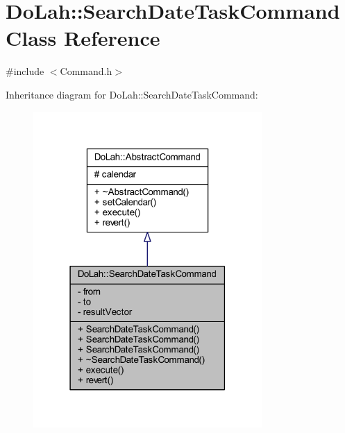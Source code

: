 \hypertarget{class_do_lah_1_1_search_date_task_command}{}\section{Do\+Lah\+:\+:Search\+Date\+Task\+Command Class Reference}
\label{class_do_lah_1_1_search_date_task_command}


{\ttfamily \#include $<$Command.\+h$>$}



Inheritance diagram for Do\+Lah\+:\+:Search\+Date\+Task\+Command\+:\nopagebreak
\begin{figure}[H]
\begin{center}
\leavevmode
\includegraphics[width=247pt]{class_do_lah_1_1_search_date_task_command__inherit__graph}
\end{center}
\end{figure}


